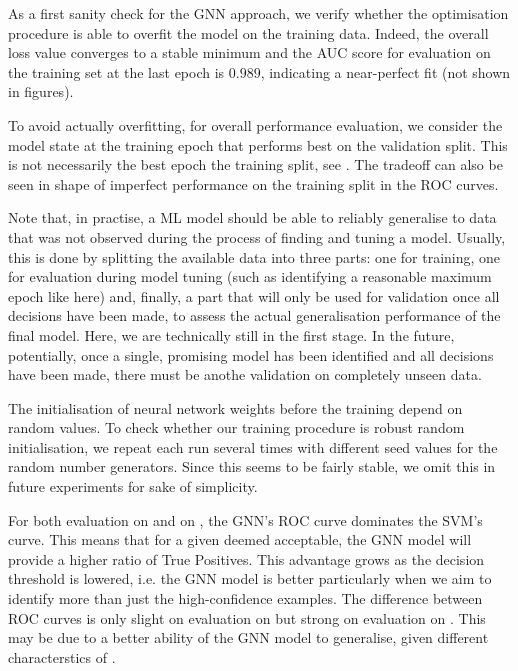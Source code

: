 \documentclass[
	fontsize=10pt, %
	twoside=false, %
	secnumdepth=1, %
]{kaobook}
\begin{document}
As a first sanity check for the GNN approach, we verify whether the optimisation
procedure is able to overfit the model on the training data. Indeed, the overall
loss value converges to a stable minimum and the AUC score for evaluation on the
training set at the last epoch is $0.989$, indicating a near-perfect fit (not
shown in figures).

To avoid actually overfitting, for overall performance evaluation, we consider
the model state at the training epoch that performs best on the validation
split. This is not necessarily the best epoch \wrt the training split, see
. The tradeoff can also be seen in shape of imperfect
performance on the training split in the ROC curves.

%
Note that, in practise, a ML model should be able to reliably generalise to data
that was not observed during the process of finding and tuning a model. Usually,
this is done by splitting the available data into three parts: one for training,
one for evaluation during model tuning (such as identifying a reasonable maximum
epoch like here) and, finally, a part that will only be used for validation once
all decisions have been made, to assess the actual generalisation performance of
the final model.
%
Here, we are technically still in the first stage. In the future, potentially,
once a single, promising model has been identified and all decisions have been
made, there must be anothe validation on completely unseen data.

The initialisation of neural network weights before the training depend on
random values. To check whether our training procedure is robust \wrt random
initialisation, we repeat each run several times with different seed values for
the random number generators. Since this seems to be fairly stable, we omit this
in future experiments for sake of simplicity.

For both evaluation on \PDMap and on \ReconMap, the GNN's ROC curve dominates
the SVM's curve. This means that for a given \FPR deemed acceptable, the GNN
model will provide a higher ratio of True Positives. This advantage grows as the
decision threshold is lowered, i.e. the GNN model is better particularly when we
aim to identify more than just the high-confidence examples. The difference
between ROC curves is only slight on evaluation on \PDMap but strong on
evaluation on \ReconMap. This may be due to a better ability of the GNN model to
generalise, given different characterstics of \ReconMap.
\end{document}
